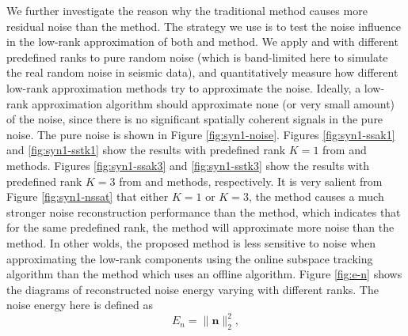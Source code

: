 We further investigate the reason why the traditional  method causes more residual noise than the  method. The strategy we use is to test the noise influence in the low-rank approximation of both  and  method. We apply  and  with different predefined ranks to pure random noise (which is band-limited here to simulate the real random noise in seismic data), and quantitatively measure how different low-rank approximation methods try to approximate the noise. Ideally, a low-rank approximation algorithm should approximate none (or very small amount) of the noise, since there is no significant spatially coherent signals in the pure noise. The pure noise is shown in Figure \ref{fig:syn1-noise}. 
Figures \ref{fig:syn1-ssak1} and \ref{fig:syn1-sstk1} show the results with predefined rank $K=1$ from  and  methods. Figures \ref{fig:syn1-ssak3} and \ref{fig:syn1-sstk3} show the results with predefined rank $K=3$ from  and  methods, respectively. It is very salient from Figure \ref{fig:syn1-nssat} that either $K=1$ or $K=3$, the  method causes a much stronger noise reconstruction performance than the  method, which indicates that for the same predefined rank, the  method will approximate more noise than the  method. In other wolds, the proposed method is less sensitive to noise when approximating the low-rank components using the online subspace tracking algorithm than the  method which uses an offline algorithm. Figure \ref{fig:e-n} shows the diagrams of reconstructed noise energy varying with different ranks. The noise energy here is defined as
\begin{equation}
\label{eq:ne}
E_n = \parallel \mathbf{n} \parallel_2^2,
\end{equation} 
